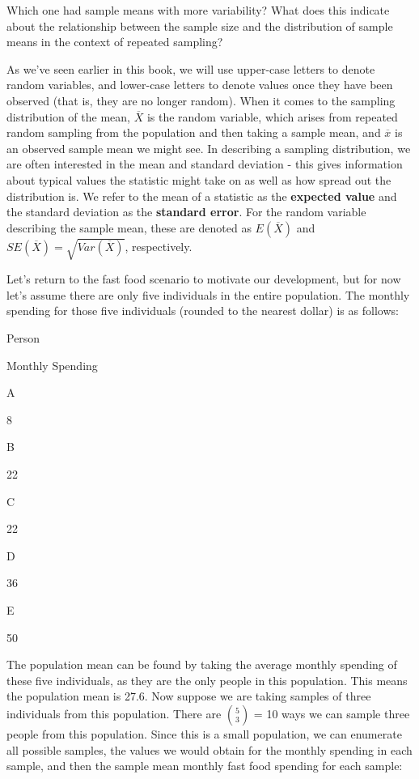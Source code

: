 \documentclass[
]{book}
\theoremstyle{definition}
\theoremstyle{definition}
\theoremstyle{definition}
\theoremstyle{remark}
\begin{document}
Which one had sample means with more variability? What does this indicate about the relationship between the sample size and the distribution of sample means in the context of repeated sampling?

As we've seen earlier in this book, we will use upper-case letters to denote random variables, and lower-case letters to denote values once they have been observed (that is, they are no longer random). When it comes to the sampling distribution of the mean, \(\overline{X}\) is the random variable, which arises from repeated random sampling from the population and then taking a sample mean, and \(\overline{x}\) is an observed sample mean we might see. In describing a sampling distribution, we are often interested in the mean and standard deviation - this gives information about typical values the statistic might take on as well as how spread out the distribution is. We refer to the mean of a statistic as the \textbf{expected value} and the standard deviation as the \textbf{standard error}. For the random variable describing the sample mean, these are denoted as \(E(\overline{X})\) and \(SE(\overline{X}) = \sqrt{Var(\overline{X})}\), respectively.

Let's return to the fast food scenario to motivate our development, but for now let's assume there are only five individuals in the entire population. The monthly spending for those five individuals (rounded to the nearest dollar) is as follows:

Person

Monthly Spending

A

8

B

22

C

22

D

36

E

50

The population mean can be found by taking the average monthly spending of these five individuals, as they are the only people in this population. This means the population mean is 27.6. Now suppose we are taking samples of three individuals from this population. There are \(\binom{5}{3}\) = 10 ways we can sample three people from this population. Since this is a small population, we can enumerate all possible samples, the values we would obtain for the monthly spending in each sample, and then the sample mean monthly fast food spending for each sample:
\end{document}

